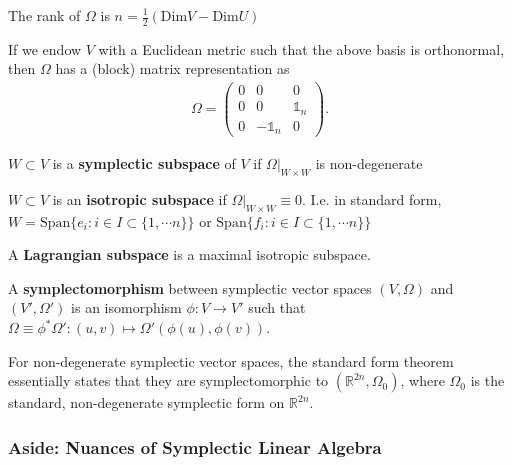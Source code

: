 \documentclass[11pt, final]{article}
\begin{document}
\begin{definition}[Rank]
	The rank of $\Omega$ is $n = \tfrac{1}{2} \left(\mathrm{Dim } V - \mathrm{Dim } U \right)$
\end{definition}

\begin{remark}
	If we endow $V$ with a Euclidean metric such that the above basis is orthonormal, then $\Omega$ has a (block) matrix representation as
		\begin{align}
			\Omega = \begin{pmatrix}
				0 & 0 & 0 \\ 0 & 0 & \mathds{1}_n \\ 0 & -\mathds{1}_n & 0
			\end{pmatrix}.
		\end{align}
\end{remark}

\begin{definition}
	$W \subset V$ is a \textbf{symplectic subspace} of $V$ if $\Omega|_{W \times W}$ is non-degenerate
\end{definition}
\begin{definition}
	$W \subset V$ is an \textbf{isotropic subspace} if $\Omega|_{W \times W} \equiv 0$. I.e. in standard form, $W = \mathrm{Span} \{e_i : {i \in I \subset \{1, \cdots n\}}\}$ or $\mathrm{Span} \{f_i : {i \in I \subset \{1, \cdots n\}}\}$
\end{definition}
\begin{definition}
	A \textbf{Lagrangian subspace} is a maximal isotropic subspace.
\end{definition}

\begin{definition}[Symplectomorphism]
	A \textbf{symplectomorphism} between symplectic vector spaces $(V,\Omega)$ and $(V',\Omega')$ is an isomorphism $\phi : V \to V'$ such that $\Omega \equiv \phi^*\Omega': (u,v) \mapsto \Omega'(\phi(u),\phi(v))$.
\end{definition}
\begin{remark}
	For non-degenerate symplectic vector spaces, the standard form theorem essentially states that they are symplectomorphic to $( \mathbb{R}^{2n},\Omega_0 )$, where $\Omega_0$ is the standard, non-degenerate symplectic form on $\mathbb{R}^{2n}$.

\end{remark}

\subsubsection{Aside: Nuances of Symplectic Linear Algebra}
\end{document}
